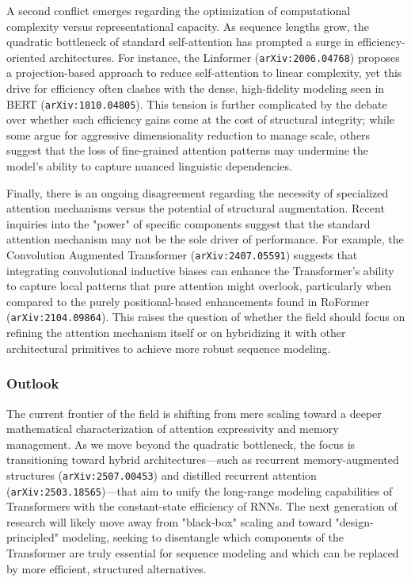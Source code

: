 \documentclass[11pt]{article}
\begin{document}
A second conflict emerges regarding the optimization of computational complexity versus representational capacity. As sequence lengths grow, the quadratic bottleneck of standard self-attention has prompted a surge in efficiency-oriented architectures. For instance, the Linformer (\texttt{arXiv:2006.04768}) proposes a projection-based approach to reduce self-attention to linear complexity, yet this drive for efficiency often clashes with the dense, high-fidelity modeling seen in BERT (\texttt{arXiv:1810.04805}). This tension is further complicated by the debate over whether such efficiency gains come at the cost of structural integrity; while some argue for aggressive dimensionality reduction to manage scale, others suggest that the loss of fine-grained attention patterns may undermine the model's ability to capture nuanced linguistic dependencies.

Finally, there is an ongoing disagreement regarding the necessity of specialized attention mechanisms versus the potential of structural augmentation. Recent inquiries into the "power" of specific components suggest that the standard attention mechanism may not be the sole driver of performance. For example, the Convolution Augmented Transformer (\texttt{arXiv:2407.05591}) suggests that integrating convolutional inductive biases can enhance the Transformer's ability to capture local patterns that pure attention might overlook, particularly when compared to the purely positional-based enhancements found in RoFormer (\texttt{arXiv:2104.09864}). This raises the question of whether the field should focus on refining the attention mechanism itself or on hybridizing it with other architectural primitives to achieve more robust sequence modeling.

\subsubsection{Outlook}

The current frontier of the field is shifting from mere scaling toward a deeper mathematical characterization of attention expressivity and memory management. As we move beyond the quadratic bottleneck, the focus is transitioning toward hybrid architectures—such as recurrent memory-augmented structures (\texttt{arXiv:2507.00453}) and distilled recurrent attention (\texttt{arXiv:2503.18565})—that aim to unify the long-range modeling capabilities of Transformers with the constant-state efficiency of RNNs. The next generation of research will likely move away from "black-box" scaling and toward "design-principled" modeling, seeking to disentangle which components of the Transformer are truly essential for sequence modeling and which can be replaced by more efficient, structured alternatives.
\end{document}
